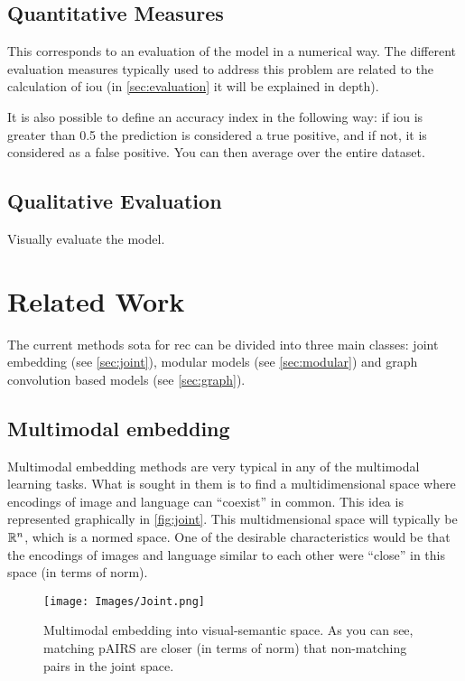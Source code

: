 \subsection{Quantitative Measures}

This corresponds to an evaluation of the model in a numerical way. The
different evaluation measures typically used to address this problem are
related to the calculation of \gls{iou} (in \vref{sec:evaluation} it will be
explained in depth).

It is also possible to define an accuracy index in the following way: if
\gls{iou} is greater than \num{0.5} the prediction is considered a true
positive, and if not, it is considered as a false positive. You can then
average over the entire dataset.

\subsection{Qualitative Evaluation}

Visually evaluate the model.


\section{Related Work} \label{sec:sota}

The current methods \gls{sota} for \gls{rec} can be divided into three main
classes: joint embedding (see \vref{sec:joint}), modular models (see
\vref{sec:modular}) and graph convolution based models (see \vref{sec:graph}).

\subsection{Multimodal embedding} \label{sec:joint}
Multimodal embedding methods are very typical in any of the multimodal learning
tasks. What is sought in them is to find a multidimensional space where
encodings of image and language can ``coexist'' in common. This idea is
represented graphically in \vref{fig:joint}. This multidmensional space will
typically be \(\mathbb{R}^n\), which is a normed space. One of the desirable
characteristics would be that the encodings of images and language similar to
each other were ``close'' in this space (in terms of norm).

\begin{figure}[ht]
  \centering
  \texttt{[image: Images/Joint.png]}
  \caption[Multimodal embedding technique]{Multimodal embedding into
    visual-semantic space. As you can see, matching pAIRS are closer (in terms
    of norm) that non-matching pairs in the joint space.}
  \label{fig:joint}
\end{figure}

